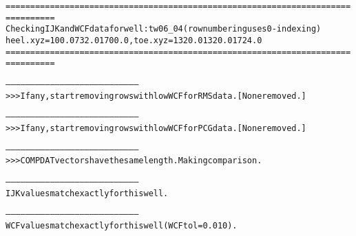 \begin{alltt}
================================================================================
Checking IJK and WCF data for well: tw06_04 (row numbering uses 0-indexing)
heel.xyz = 100.0 732.0 1700.0, toe.xyz = 1320.0 1320.0 1724.0
================================================================================

--------------------------------------------------------------------------------
>>> If any, start removing rows with low WCF for RMS data. [None removed.]

--------------------------------------------------------------------------------
>>> If any, start removing rows with low WCF for PCG data. [None removed.]

--------------------------------------------------------------------------------
>>> COMPDAT vectors have the same length. Making comparison.

--------------------------------------------------------------------------------
IJK values match exactly for this well.

--------------------------------------------------------------------------------
WCF values match exactly for this well (WCF tol = 0.010).
\end{alltt}
